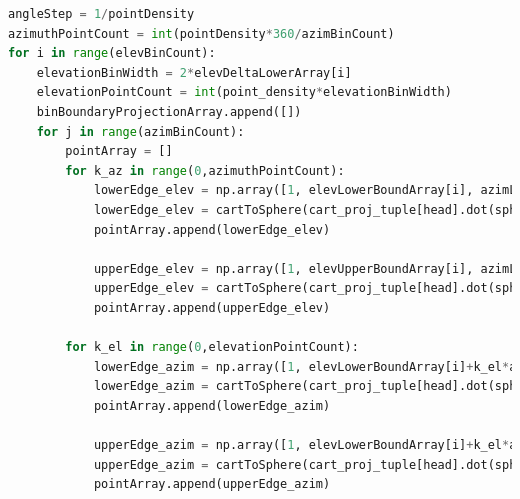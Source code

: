 \lstset{basicstyle=\tiny, style=myCustomMatlabStyle}
\begin{lstlisting}[language=Python]
angleStep = 1/pointDensity
azimuthPointCount = int(pointDensity*360/azimBinCount)
for i in range(elevBinCount):
    elevationBinWidth = 2*elevDeltaLowerArray[i]
    elevationPointCount = int(point_density*elevationBinWidth)
    binBoundaryProjectionArray.append([])
    for j in range(azimBinCount):
        pointArray = []
        for k_az in range(0,azimuthPointCount):
            lowerEdge_elev = np.array([1, elevLowerBoundArray[i], azimLowerBoundArray[j]+k_az*angleStep])
            lowerEdge_elev = cartToSphere(cart_proj_tuple[head].dot(sphereToCart(lowerEdge_elev)))
            pointArray.append(lowerEdge_elev)

            upperEdge_elev = np.array([1, elevUpperBoundArray[i], azimLowerBoundArray[j]+k_az*angleStep])
            upperEdge_elev = cartToSphere(cart_proj_tuple[head].dot(sphereToCart(upperEdge_elev)))
            pointArray.append(upperEdge_elev)

        for k_el in range(0,elevationPointCount):
            lowerEdge_azim = np.array([1, elevLowerBoundArray[i]+k_el*angleStep, azimLowerBoundArray[j]])
            lowerEdge_azim = cartToSphere(cart_proj_tuple[head].dot(sphereToCart(lowerEdge_azim)))
            pointArray.append(lowerEdge_azim)

            upperEdge_azim = np.array([1, elevLowerBoundArray[i]+k_el*angleStep, azimUpperBoundArray[j]])
            upperEdge_azim = cartToSphere(cart_proj_tuple[head].dot(sphereToCart(upperEdge_azim)))
            pointArray.append(upperEdge_azim)
\end{lstlisting}
\\

